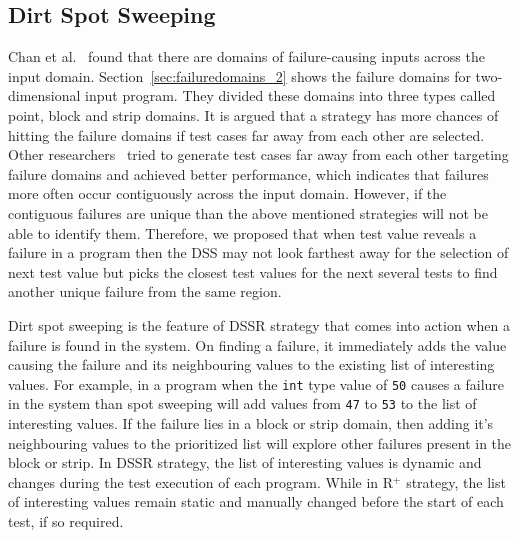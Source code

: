 \subsection{Dirt Spot Sweeping}
Chan et al.~\cite{chan1996proportional} found that there are domains of failure-causing inputs across the input domain. Section~\ref{sec:failuredomains_2} shows the failure domains for two-dimensional input program. They divided these domains into three types called point, block and strip domains. It is argued that a strategy has more chances of hitting the failure domains if test cases far away from each other are selected. Other researchers~\cite{chan2003normalized, chen2004mirror, chen2007quasi} tried to generate test cases far away from each other targeting failure domains and achieved better performance, which indicates that failures more often occur contiguously across the input domain. However, if the contiguous failures are unique than the above mentioned strategies will not be able to identify them. Therefore, we proposed that when test value reveals a failure in a program then the DSS may not look farthest away for the selection of next test value but picks the closest test values for the next several tests to find another unique failure from the same region.






Dirt spot sweeping is the feature of DSSR strategy that comes into action when a failure is found in the system. On finding a failure, it immediately adds the value causing the failure and its neighbouring values to the existing list of interesting values. For example, in a program when the \verb+int+ type value of \verb+50+ causes a failure in the system than spot sweeping will add values from \verb+47+ to \verb+53+ to the list of interesting values. If the failure lies in a block or strip domain, then adding it's neighbouring values to the prioritized list will explore other failures present in the block or strip. In DSSR strategy, the list of interesting values is dynamic and changes during the test execution of each program. While in R$^+$ strategy, the list of interesting values remain static and manually changed before the start of each test, if so required.

